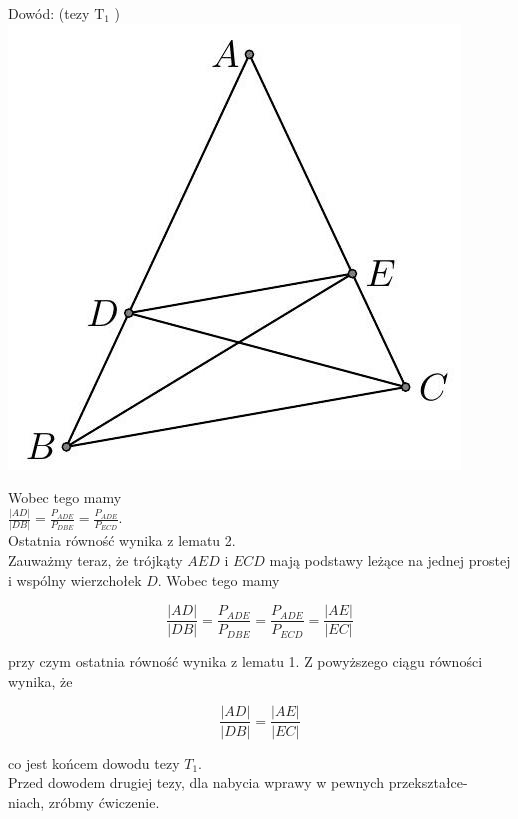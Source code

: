 \documentclass[10pt]{article}
\begin{document}
Dowód: (tezy \(\mathrm{T}_{1}\) )\\
\includegraphics[max width=\textwidth, center]{2024_11_21_e9b4faa005d5be2cc318g-006}

Wobec tego mamy\\
\(\frac{|A D|}{|D B|}=\frac{P_{A D E}}{P_{D B E}}=\frac{P_{A D E}}{P_{E C D}}\).\\
Ostatnia równość wynika z lematu 2.\\
Zauważmy teraz, że trójkąty \(A E D\) i \(E C D\) mają podstawy leżące na jednej prostej i wspólny wierzchołek \(D\). Wobec tego mamy

\[
\frac{|A D|}{|D B|}=\frac{P_{A D E}}{P_{D B E}}=\frac{P_{A D E}}{P_{E C D}}=\frac{|A E|}{|E C|}
\]

przy czym ostatnia równość wynika z lematu 1. Z powyższego ciągu równości wynika, że

\[
\frac{|A D|}{|D B|}=\frac{|A E|}{|E C|}
\]

co jest końcem dowodu tezy \(T_{1}\).\\
Przed dowodem drugiej tezy, dla nabycia wprawy w pewnych przekształce-\\
niach, zróbmy ćwiczenie.
\end{document}
